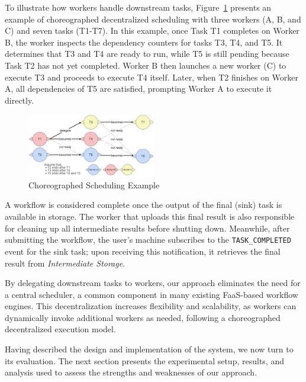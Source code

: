 To illustrate how workers handle downstream tasks, Figure~\ref{fig:choreographed_scheduling_example} presents an example of choreographed decentralized scheduling with three workers (A, B, and C) and seven tasks (T1-T7). In this example, once Task T1 completes on Worker B, the worker inspects the dependency counters for tasks T3, T4, and T5. It determines that T3 and T4 are ready to run, while T5 is still pending because Task T2 has not yet completed. Worker B then launches a new worker (C) to execute T3 and proceeds to execute T4 itself. Later, when T2 finishes on Worker A, all dependencies of T5 are satisfied, prompting Worker A to execute it directly.

\begin{figure}[h]
    \centering
    \includegraphics[width=0.5\textwidth]{Images/mine/choreographed_execution_example.png}
    \caption{Choreographed Scheduling Example}
    \label{fig:choreographed_scheduling_example}
\end{figure}

A workflow is considered complete once the output of the final (sink) task is available in storage. The worker that uploads this final result is also responsible for cleaning up all intermediate results before shutting down. Meanwhile, after submitting the workflow, the user's machine subscribes to the \texttt{TASK\_COMPLETED} event for the sink task; upon receiving this notification, it retrieves the final result from \textit{Intermediate Storage}.

By delegating downstream tasks to workers, our approach eliminates the need for a central scheduler, a common component in many existing FaaS-based workflow engines. This decentralization increases flexibility and scalability, as workers can dynamically invoke additional workers as needed, following a choreographed decentralized execution model.

Having described the design and implementation of the system, we now turn to its evaluation. The next section presents the experimental setup, results, and analysis used to assess the strengths and weaknesses of our approach.